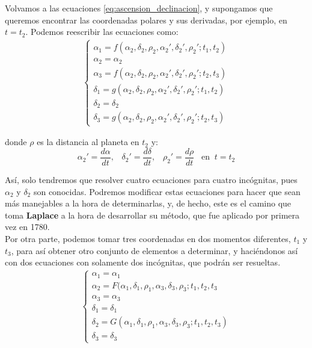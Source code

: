 \documentclass[11pt]{book}
\begin{document}
Volvamos a las ecuaciones \eqref{eq:ascension_declinacion}, y supongamos que queremos encontrar las coordenadas polares y sus derivadas, por ejemplo, en $t=t_2$. Podemos reescribir las ecuaciones como:
\begin{align}
\left\{\begin{array}{l}
	\alpha_1 = f(\alpha_2, \delta_2, \rho_2, \alpha_2', \delta_2', \rho_2'; t_1, t_2)\\ 
	\alpha_2 = \alpha_2\\
	\alpha_3 = f(\alpha_2, \delta_2, \rho_2, \alpha_2', \delta_2', \rho_2'; t_2, t_3)\\
	\delta_1 = g(\alpha_2, \delta_2, \rho_2, \alpha_2', \delta_2', \rho_2'; t_1, t_2)\\
	\delta_2 = \delta_2\\
	\delta_3 = g(\alpha_2, \delta_2, \rho_2, \alpha_2', \delta_2', \rho_2'; t_2, t_3)
\end{array}
\right.
\label{eq:idea_laplace}
\end{align}

\noindent donde $\rho$ es la distancia al planeta en $t_2$ y:
\[
\alpha_2'=\frac{d\alpha}{dt}, \; \; \; \delta_2'=\frac{d\delta}{dt}, \; \; \; \rho_2'=\frac{d\rho}{dt} \; \; \;  \text{en} \; \; t=t_2
\]

Así, solo tendremos que resolver cuatro ecuaciones para cuatro incógnitas, pues $\alpha_2$ y $\delta_2$ son conocidas. Podremos modificar estas ecuaciones para hacer que sean más manejables a la hora de determinarlas, y, de hecho, este es el camino que toma \textbf{Laplace} a la hora de desarrollar su método, que fue aplicado por primera vez en 1780.\\

Por otra parte, podemos tomar tres coordenadas en dos momentos diferentes, $t_1$ y $t_3$, para así obtener otro conjunto de elementos a determinar, y haciéndonos así con dos ecuaciones con solamente dos incógnitas, que podrán ser resueltas.
\begin{align}
\left\{\begin{array}{l}
	\alpha_1 = \alpha_1\\
	\alpha_2 = F(\alpha_1, \delta_1, \rho_1, \alpha_3, \delta_3, \rho_3; t_1, t_2, t_3\\
	\alpha_3 = \alpha_3\\
	\delta_1 = \delta_1\\
	\delta_2 = G(\alpha_1, \delta_1, \rho_1, \alpha_3, \delta_3, \rho_3; t_1, t_2, t_3)\\
	\delta_3 = \delta_3
\end{array}
\right.
\label{eq:camino_gauss}
\end{align}
\end{document}
